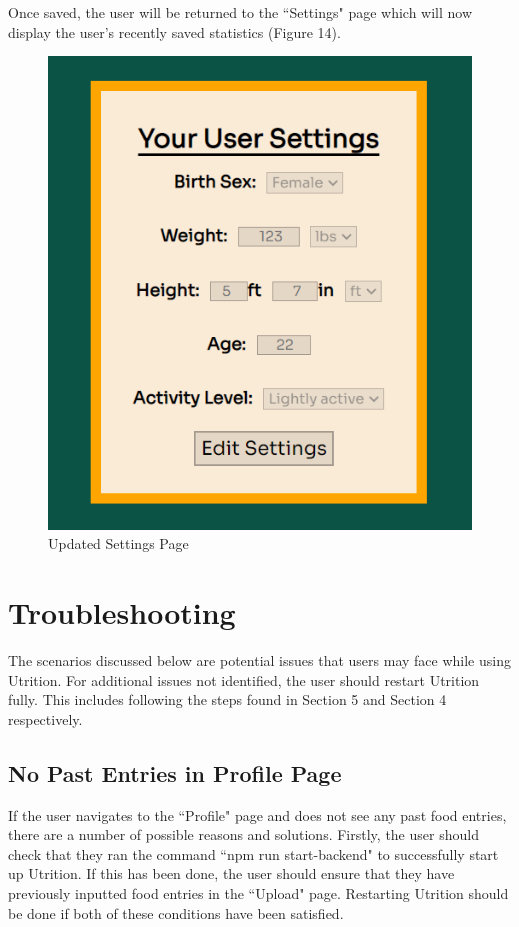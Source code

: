 \documentclass{article}
\begin{document}
Once saved, the user will be returned to the ``Settings" page which will now display the user's recently saved statistics (Figure 14). 

\begin{figure}[H]
	\centering
	\includegraphics[scale=0.70]{updatedsettings.png}
	\caption{Updated Settings Page}
\end{figure}

\section{Troubleshooting}
The scenarios discussed below are potential issues that users may face while using Utrition. For additional issues not identified, the user should restart Utrition fully. This includes following the steps found in Section 5 and Section 4 respectively.

\subsection{No Past Entries in Profile Page}
If the user navigates to the ``Profile" page and does not see any past food entries, there are a number of possible reasons and solutions. Firstly, the user should check that they ran the command ``npm run start-backend" to successfully start up Utrition. If this has been done, the user should ensure that they have previously inputted food entries in the ``Upload" page. Restarting Utrition should be done if both of these conditions have been satisfied.
\end{document}
